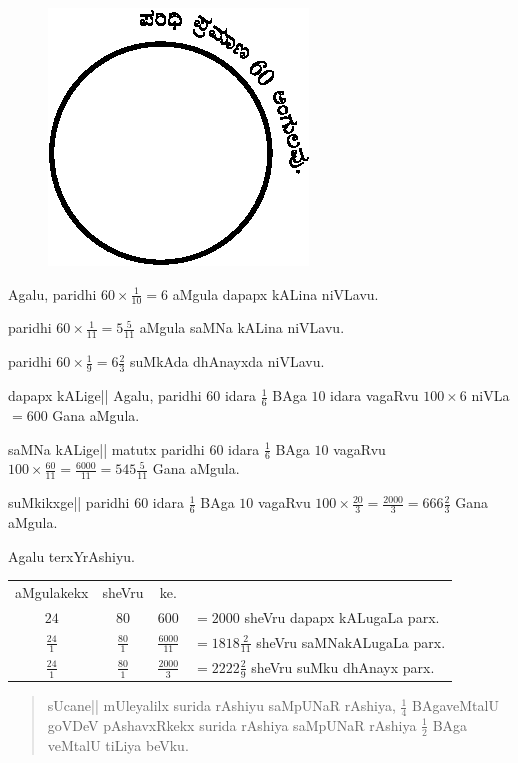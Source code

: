 \begin{figure}[H]
\centering
\includegraphics{figure/fig43.eps}
\end{figure}

Agalu, paridhi $60\times \frac{1}{10}=6$ aMgula dapapx kALina niVLavu.

paridhi $60\times \frac{1}{11}=5\frac{5}{11}$ aMgula saMNa kALina
niVLavu.

paridhi $60\times \frac{1}{9}=6\frac{2}{3}$ suMkAda dhAnayxda niVLavu.

dapapx kALige|| Agalu, paridhi $60$ idara $\frac{1}{6}$ BAga $10$
idara vagaRvu $100\times 6$ niVLa $=600$ Gana aMgula.

saMNa kALige|| matutx paridhi $60$ idara $\frac{1}{6}$ BAga $10$
vagaRvu $100\times \frac{60}{11}=\frac{6000}{11}=545\frac{5}{11}$ Gana
aMgula. 

suMkikxge|| paridhi $60$ idara $\frac{1}{6}$ BAga $10$ vagaRvu
$100\times \frac{20}{3}=\frac{2000}{3}=666\frac{2}{3}$ Gana aMgula.

Agalu terxYrAshiyu.
\begin{center}
\begin{tabular}{c@{\,:\,}c@{\,::\,}cl}
aMgulakekx & sheVru & ke. & \\[3pt]
$24$ & $80$ & $600$ & $=2000$ sheVru dapapx kALugaLa parx.\\[3pt]
$\frac{24}{1}$ & $\frac{80}{1}$ & $\frac{6000}{11}$ &
$=1818\frac{2}{11}$ sheVru saMNakALugaLa parx.\\[3pt]
$\frac{24}{1}$ & $\frac{80}{1}$ & $\frac{2000}{3}$ &
$=2222\frac{2}{9}$ sheVru suMku dhAnayx parx.
\end{tabular}
\end{center}

\begin{verse}
sUcane|| mUleyalilx surida rAshiyu saMpUNaR rAshiya, $\frac{1}{4}$
BAgaveMtalU goVDeV pAshavxRkekx surida rAshiya saMpUNaR rAshiya
$\frac{1}{2}$ BAga veMtalU tiLiya beVku. 
\end{verse}

